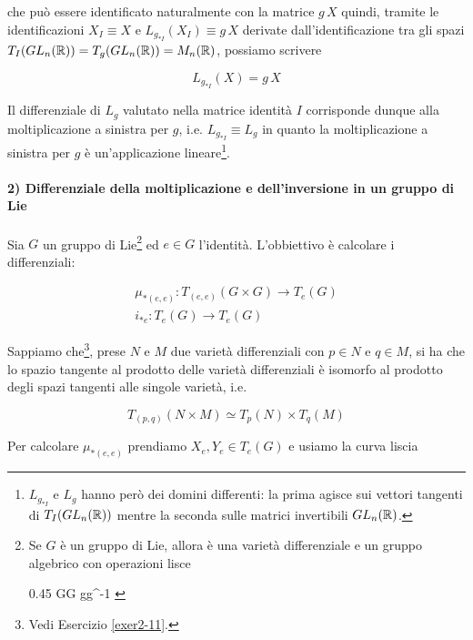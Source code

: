 che può essere identificato naturalmente con la matrice $ g \, X $ quindi, tramite le identificazioni $ X_{I} \equiv X $ e $ L_{g_{*I}}(X_{I}) \equiv g \, X $ derivate dall'identificazione tra gli spazi $ T_{I}(GL_{n}(\mathbb{R})) = T_{g}(GL_{n}(\mathbb{R})) = M_{n}(\mathbb{R}) $, possiamo scrivere

\begin{equation}
	L_{g_{*I}}(X) = g \, X
\end{equation}

Il differenziale di $ L_{g} $ valutato nella matrice identità $ I $ corrisponde dunque alla moltiplicazione a sinistra per $ g $, i.e. $ L_{g_{*I}} \equiv L_{g} $ in quanto la moltiplicazione a sinistra per $ g $ è un'applicazione lineare\footnote{%
	$ L_{g_{*I}} $ e $ L_{g} $ hanno però dei domini differenti: la prima agisce sui vettori tangenti di $ T_{I}(GL_{n}(\mathbb{R})) $ mentre la seconda sulle matrici invertibili $ GL_{n}(\mathbb{R}) $.%
}.

\paragraph{2) Differenziale della moltiplicazione e dell'inversione in un gruppo di Lie}\label{example:differ-prod-inv-lie}

Sia $ G $ un gruppo di Lie\footnote{%
	Se $ G $ è un gruppo di Lie, allora è una varietà differenziale e un gruppo algebrico con operazioni lisce
	
		{0.45}{%
				{G}{G}
				{g}{g^{-1}}
				}%
} ed $ e \in G $ l'identità. L'obbiettivo è calcolare i differenziali:

\begin{gather}
	\mu_{*(e,e)} : T_{(e,e)}(G \times G) \to T_{e}(G) \\
	i_{*e} : T_{e}(G) \to T_{e}(G)
\end{gather}

Sappiamo che\footnote{%
	Vedi Esercizio \ref{exer2-11}.%
}, prese $ N $ e $ M $ due varietà differenziali con $ p \in N $ e $ q \in M $, si ha che lo spazio tangente al prodotto delle varietà differenziali è isomorfo al prodotto degli spazi tangenti alle singole varietà, i.e.

\begin{equation}
	T_{(p,q)}(N \times M) \simeq T_{p}(N) \times T_{q}(M)
\end{equation}

Per calcolare $ \mu_{*(e,e)} $ prendiamo $ X_{e},Y_{e} \in T_{e}(G) $ e usiamo la curva liscia

